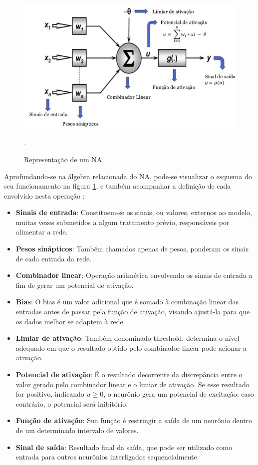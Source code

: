 \begin{figure}[!h]
    \centering
    \begin{minipage}{0.9\linewidth}
    \centering
    \captionsetup{justification=centering,margin=0.5cm,font=small}
    \includegraphics[width=0.7\linewidth]{img/cap2/na-completo.png}
    \caption{Representação de um NA \cite{adorno2017}}.
    \label{fig:na}
    \end{minipage}
\end{figure}

Aprofundando-se na álgebra relacionada do NA, pode-se visualizar o esquema do seu funcionamento na figura \ref{fig:na}, e também acompanhar a definição de cada envolvido nesta operação \cite{deeplearningbook2023}:

\begin{itemize}
    \item \textbf{Sinais de entrada}: Constituem-se os sinais, ou valores, externos ao modelo, muitas vezes submetidos a algum tratamento prévio, responsáveis por alimentar a rede.
    \item \textbf{Pesos sinápticos}: Também chamados apenas de pesos, ponderam os sinais de cada entrada da rede.
    \item \textbf{Combinador linear}: Operação aritmética envolvendo os sinais de entrada a fim de gerar um potencial de ativação.
    \item \textbf{Bias}: O bias é um valor adicional que é somado à combinação linear das entradas antes de passar pela função de ativação, visando ajustá-la para que os dados melhor se adaptem à rede.
    \item \textbf{Limiar de ativação}: Também denominado threshold, determina o nível adequado em que o resultado obtido pelo combinador linear pode acionar a ativação.
    \item \textbf{Potencial de ativação}: É o resultado decorrente da discrepância entre o valor gerado pelo combinador linear e o limiar de ativação. Se esse resultado for positivo, indicando \(u \geq 0\), o neurônio gera um potencial de excitação; caso contrário, o potencial será inibitório.
    \item \textbf{Função de ativação}: Sua função é restringir a saída de um neurônio dentro de um determinado intervalo de valores.
    \item \textbf{Sinal de saída}: Resultado final da saída, que pode ser utilizado como entrada para outros neurônios interligados sequencialmente.
\end{itemize}  

